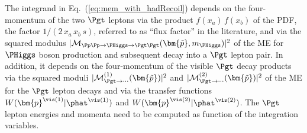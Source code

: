 The integrand in Eq.~(\ref{eq:mem_with_hadRecoil}) depends on the
four-momentum of the two $\Pgt$ leptons via the 
product $f(x_{a}) \, f(x_{b})$ of the PDF,
the factor $1/(2 \, x_{a} \, x_{b} \, s)$, referred to as ``flux factor'' in the literature,
and via the squared modulus $\vert \mathcal{M}_{\Pp\Pp \to \PHiggs \to \Pgt\Pgt}(\bm{\tilde{p}},m_{\PHiggs}) \vert^{2}$ 
of the ME for $\PHiggs$ boson production and subsequent decay into a $\Pgt$ lepton pair.
In addition, it depends on the four-momentum of the visible $\Pgt$ decay products via the
squared moduli $\vert \mathcal{M}^{(1)}_{\Pgt\to\cdots}(\bm{\tilde{p}}) \vert^{2}$ and $\vert \mathcal{M}^{(2)}_{\Pgt\to\cdots}(\bm{\tilde{p}}) \vert^{2}$ of the ME for the $\Pgt$ lepton decays
and via the transfer functions $W( \bm{p}^{\vis(1)} | \phat^{\vis(1)} )$ and $W( \bm{p}^{\vis(2)} | \phat^{\vis(2)} )$.
The $\Pgt$ lepton energies and momenta need to be computed as function of the integration variables.

